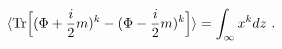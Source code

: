 \begin{equation}
\langle{\rm Tr} \Big[(\Phi+\frac{i}{2}m)^k-(\Phi-\frac{i}{2}m)^k \Big]\rangle=
\int_{\infty} x^k dz \ .
\label{moments}
\end{equation}

